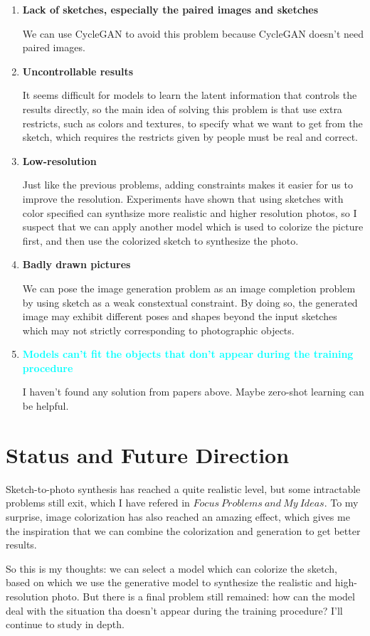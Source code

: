\documentclass{article}
\begin{document}
\begin{enumerate}
\item \textbf{Lack of sketches, especially the paired images and sketches}\par
We can use CycleGAN to avoid this problem because CycleGAN doesn't need paired images.


\item \textbf{Uncontrollable results}\par
It seems difficult for models to learn the latent information that controls the results directly, so the main idea of solving this problem is that use extra restricts, such as colors and textures, to specify what we want to get from the sketch, which requires the restricts given by people must be real and correct. 


\item \textbf{Low-resolution}\par
Just like the previous problems, adding constraints makes it easier for us to improve the resolution. Experiments have shown that using sketches with color specified can synthsize more realistic and higher resolution photos, so I suspect that we can apply another model which is used to colorize the picture first, and then use the colorized sketch to synthesize the photo.

\item \textbf{Badly drawn pictures}\par
We can pose the image generation problem as an image completion problem by using sketch as a weak constextual constraint. By doing so, the generated image may exhibit different poses and shapes beyond the input sketches which may not strictly corresponding to photographic objects.




\item \textbf{\textcolor{cyan}{Models can't fit the objects that don't appear during the training procedure}} \par
I haven't found any solution from papers above. Maybe zero-shot learning can be helpful.

\end{enumerate}


\section{Status and Future Direction}
\indent Sketch-to-photo synthesis has reached a quite realistic level, but some intractable problems still exit, which I have refered in $Focus\ Problems\ and\ My\ Ideas$. To my surprise, image colorization has also reached an amazing effect, which gives me the inspiration that we can combine the colorization and generation to get better results.\par
So this is my thoughts: we can select a model which can colorize the sketch, based on which we use the generative model to synthesize the realistic and high-resolution photo.
But there is a final problem still remained: how can the model deal with the situation tha doesn't appear during the training procedure? I'll continue to  study in depth. 




\end{document}
